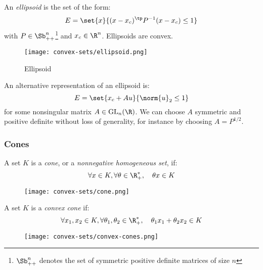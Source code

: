 \begin{definition}[Ellipsoid]
    An \emph{ellipsoid} is the set of the form:
    \begin{equation*}
        E = \set{x}{(x - x_c)^\tp P^{-1}(x - x_c)\leq 1}
    \end{equation*}
    with $P\in\Sb^n_{++}$\footnote{$\Sb^n_{++}$ denotes the set of symmetric positive definite matrices of size $n$} and $x_c\in\R^n$. Ellipsoids are convex.

    \begin{figure}[H]
        \centering
        \texttt{[image: convex-sets/ellipsoid.png]}
        \caption{Ellipsoid}
    \end{figure}

    An alternative representation of an ellipsoid is:
    \begin{equation*}
        E = \set{x_c + Au}{\norm{u}_2\leq 1}
    \end{equation*}
    for some nonsingular matrix $A\in\textnormal{GL}_n(\R)$. We can choose $A$ symmetric and positive definite without loss of generality, for instance by choosing $A = P^{1/2}$.
\end{definition}

\subsubsection{Cones}
\begin{definition}[Cones]
    A set $K$ is a \emph{cone}, or a \emph{nonnegative homogeneous set}, if:
    \begin{equation*}
        \forall x\in K, \forall \theta\in\R_+^*, \quad \theta x\in K
    \end{equation*}

    \begin{figure}[H]
        \centering
        \texttt{[image: convex-sets/cone.png]}
    \end{figure}
\end{definition}

\begin{definition}
    A set $K$ is a \emph{convex cone} if:
    \begin{equation*}
        \forall x_1, x_2\in K, \forall \theta_1, \theta_2\in\R_+^*, \quad \theta_1x_1 + \theta_2x_2\in K
    \end{equation*}

    \begin{figure}[H]
        \centering
        \texttt{[image: convex-sets/convex-cones.png]}
    \end{figure}
\end{definition}

